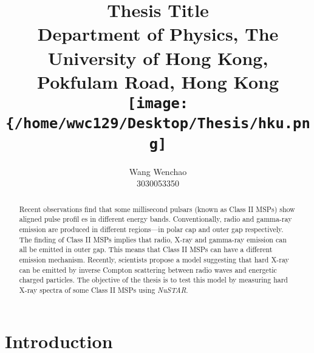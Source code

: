 \documentclass[12pt]{report}
\title{\textbf{Thesis Title}\\ \vspace{1cm}
			{\large Department of Physics, The University of Hong Kong, Pokfulam Road, Hong Kong}\\ \vspace{1cm}
			{\texttt{[image: \{/home/wwc129/Desktop/Thesis/hku.png]}}}\\ \vspace{3cm}
}
\date{}
\author{Wang Wenchao  \\3030053350}
\begin{document}
\maketitle
\tableofcontents{}
\begin{abstract}
    \normalsize
    Recent observations find that some millisecond pulsars (known as Class II MSPs) show aligned pulse profil
    es in 
    different energy bands. Conventionally, radio and gamma-ray emission are produced in different 
    regions---in polar cap 
    and outer gap respectively. The finding of Class II MSPs implies that radio, X-ray and gamma-ray 
    emission 
    can all be emitted in outer gap. This means that Class II MSPs can have a different emission mechanism. 
    Recently, 
    scientists propose a model suggesting that hard X-ray can be emitted by inverse Compton scattering 
    between radio
    waves and energetic charged particles. The objective of the thesis is to test this model by measuring 
    hard X-ray 
    spectra of some Class II MSPs using \textit{NuSTAR}. 
\end{abstract}
			
		
		
\chapter{Introduction}   	   
\end{document}

